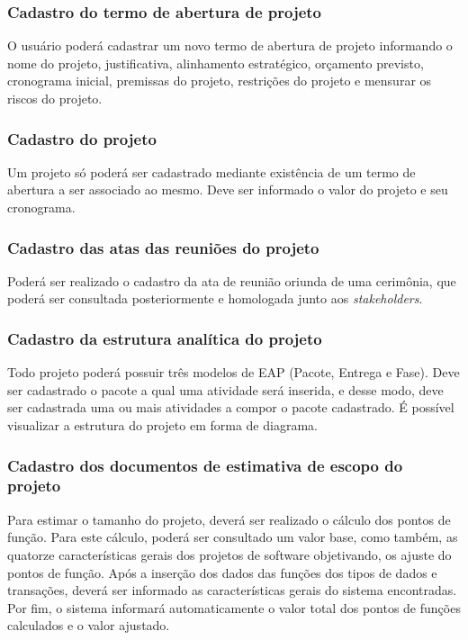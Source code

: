 \documentclass{acm_proc_article-sp}
\begin{document}
\subsubsection{Cadastro do termo de abertura de projeto}
O usuário poderá cadastrar um novo termo de abertura de projeto informando o nome do projeto, justificativa, alinhamento estratégico, orçamento previsto, cronograma inicial, premissas do projeto, restrições do projeto e mensurar os riscos do projeto. 

\subsubsection{Cadastro do projeto}
Um projeto só poderá ser cadastrado mediante existência de um termo de abertura a ser associado ao mesmo. Deve ser informado o valor do projeto e seu cronograma.

\subsubsection{Cadastro das atas das reuniões do projeto}
Poderá ser realizado o cadastro da ata de reunião oriunda de uma cerimônia, que poderá ser consultada posteriormente e homologada junto aos \textit{stakeholders}.

\subsubsection{Cadastro da estrutura analítica do projeto}
Todo projeto poderá possuir três modelos de EAP (Pacote, Entrega e Fase). Deve ser cadastrado o pacote a qual uma atividade será inserida, e desse modo, deve ser cadastrada uma ou mais atividades a compor o pacote cadastrado. É possível visualizar a estrutura do projeto em forma de diagrama. 

\subsubsection{Cadastro dos documentos de estimativa de escopo do projeto}
Para estimar o tamanho do projeto, deverá ser realizado o cálculo dos pontos de função. Para este cálculo, poderá ser consultado um valor base, como também, as quatorze características gerais dos projetos de software objetivando, os ajuste do pontos de função. Após a inserção dos dados das funções dos tipos de dados e transações, deverá ser informado as características gerais do sistema encontradas. Por fim, o sistema informará automaticamente o valor total dos pontos de funções calculados e o valor ajustado.
\end{document}
